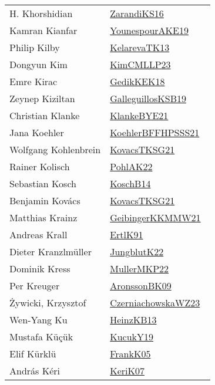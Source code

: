{\begin{longtable}{p{4cm}p{20cm}}
H. Khorshidian & \href{articles/ZarandiKS16.pdf}{ZarandiKS16}~\cite{ZarandiKS16}\\
Kamran Kianfar & \href{}{YounespourAKE19}~\cite{YounespourAKE19}\\
Philip Kilby & \href{papers/KelarevaTK13.pdf}{KelarevaTK13}~\cite{KelarevaTK13}\\
Dongyun Kim & \href{papers/KimCMLLP23.pdf}{KimCMLLP23}~\cite{KimCMLLP23}\\
Emre Kirac & \href{articles/GedikKEK18.pdf}{GedikKEK18}~\cite{GedikKEK18}\\
Zeynep Kiziltan & \href{papers/GalleguillosKSB19.pdf}{GalleguillosKSB19}~\cite{GalleguillosKSB19}\\
Christian Klanke & \href{papers/KlankeBYE21.pdf}{KlankeBYE21}~\cite{KlankeBYE21}\\
Jana Koehler & \href{articles/KoehlerBFFHPSSS21.pdf}{KoehlerBFFHPSSS21}~\cite{KoehlerBFFHPSSS21}\\
Wolfgang Kohlenbrein & \href{papers/KovacsTKSG21.pdf}{KovacsTKSG21}~\cite{KovacsTKSG21}\\
Rainer Kolisch & \href{articles/PohlAK22.pdf}{PohlAK22}~\cite{PohlAK22}\\
Sebastian Kosch & \href{papers/KoschB14.pdf}{KoschB14}~\cite{KoschB14}\\
Benjamin Kov{\'{a}}cs & \href{papers/KovacsTKSG21.pdf}{KovacsTKSG21}~\cite{KovacsTKSG21}\\
Matthias Krainz & \href{papers/GeibingerKKMMW21.pdf}{GeibingerKKMMW21}~\cite{GeibingerKKMMW21}\\
Andreas Krall & \href{papers/ErtlK91.pdf}{ErtlK91}~\cite{ErtlK91}\\
Dieter Kranzlm{\"{u}}ller & \href{}{JungblutK22}~\cite{JungblutK22}\\
Dominik Kress & \href{articles/MullerMKP22.pdf}{MullerMKP22}~\cite{MullerMKP22}\\
Per Kreuger & \href{papers/AronssonBK09.pdf}{AronssonBK09}~\cite{AronssonBK09}\\
Żywicki, Krzysztof & \href{articles/CzerniachowskaWZ23.pdf}{CzerniachowskaWZ23}~\cite{CzerniachowskaWZ23}\\
Wen{-}Yang Ku & \href{papers/HeinzKB13.pdf}{HeinzKB13}~\cite{HeinzKB13}\\
Mustafa K{\"u}ç{\"u}k & \href{}{KucukY19}~\cite{KucukY19}\\
Elif K{\"{u}}rkl{\"{u}} & \href{papers/FrankK05.pdf}{FrankK05}~\cite{FrankK05}\\
Andr{\'{a}}s K{\'{e}}ri & \href{papers/KeriK07.pdf}{KeriK07}~\cite{KeriK07}\\

\end{longtable}}
